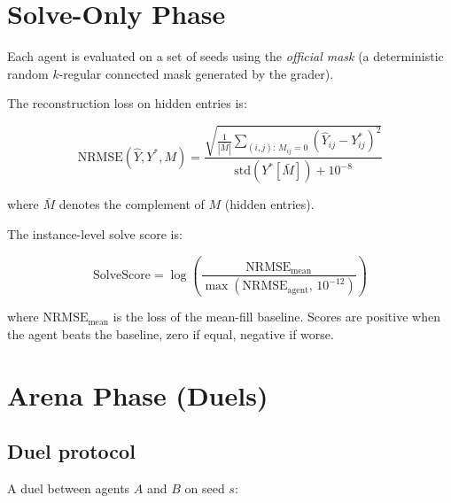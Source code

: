 \documentclass[11pt,a4paper]{article}
\begin{document}
\section{Solve-Only Phase}

Each agent is evaluated on a set of seeds using the \emph{official mask}
(a deterministic random $k$-regular connected mask generated by the grader).

The reconstruction loss on hidden entries is:

\begin{equation}
  \text{NRMSE}(\hat{Y}, Y^*, M) =
    \frac{\sqrt{\frac{1}{|\bar{M}|} \sum_{(i,j):\, M_{ij}=0} (\hat{Y}_{ij} - Y^*_{ij})^2}}
         {\text{std}(Y^*[\bar{M}]) + 10^{-8}}
  \label{eq:nrmse}
\end{equation}

where $\bar{M}$ denotes the complement of $M$ (hidden entries).

The instance-level solve score is:

\begin{equation}
  \text{SolveScore} = \log\!\left(\frac{\text{NRMSE}_{\text{mean}}}{\max(\text{NRMSE}_{\text{agent}},\, 10^{-12})}\right)
  \label{eq:solve-score}
\end{equation}

where $\text{NRMSE}_{\text{mean}}$ is the loss of the mean-fill baseline.
Scores are positive when the agent beats the baseline, zero if equal, negative if worse.

\section{Arena Phase (Duels)}

\subsection{Duel protocol}

A duel between agents $A$ and $B$ on seed $s$:
\end{document}
